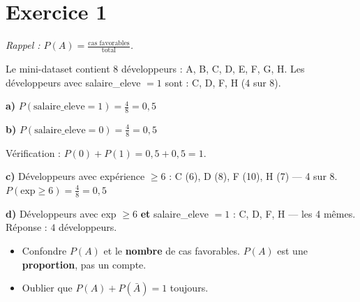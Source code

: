 %






\setlength{\parskip}{2pt}
\setlength{\abovedisplayskip}{5pt}
\setlength{\belowdisplayskip}{5pt}

\section*{Exercice 1 \hfill \exofondamental}
\textit{Rappel : $P(A) = \frac{\text{cas favorables}}{\text{total}}$.}

\separateur

Le mini-dataset contient 8 d\'{e}veloppeurs : A, B, C, D, E, F, G, H.
Les d\'{e}veloppeurs avec salaire\_eleve $= 1$ sont : C, D, F, H (4 sur 8).

\textbf{a)} $P(\text{salaire\_eleve} = 1) = \frac{4}{8} = \boxed{0{,}5}$

\textbf{b)} $P(\text{salaire\_eleve} = 0) = \frac{4}{8} = \boxed{0{,}5}$

V\'{e}rification : $P(0) + P(1) = 0{,}5 + 0{,}5 = 1$. \checkmark

\textbf{c)} D\'{e}veloppeurs avec exp\'{e}rience $\geq 6$ : C (6), D (8), F (10), H (7) --- 4 sur 8.
$P(\text{exp} \geq 6) = \frac{4}{8} = \boxed{0{,}5}$

\textbf{d)} D\'{e}veloppeurs avec exp $\geq 6$ \textbf{et} salaire\_eleve $= 1$ :
C, D, F, H --- les 4 m\^{e}mes. R\'{e}ponse : $\boxed{4}$ d\'{e}veloppeurs.

\begin{attentionbox}
\begin{itemize}
    \item Confondre $P(A)$ et le \textbf{nombre} de cas favorables. $P(A)$ est une \textbf{proportion}, pas un compte.
    \item Oublier que $P(A) + P(\bar{A}) = 1$ toujours.
\end{itemize}
\end{attentionbox}


